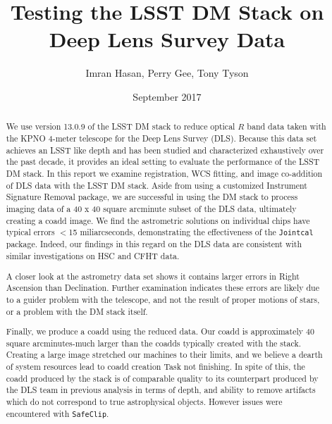 \documentclass[modern]{aastex61}
\begin{document}
\title{Testing the LSST DM Stack on Deep Lens Survey Data}

\author{Imran Hasan, Perry Gee, Tony Tyson}
\date{September 2017}




\begin{abstract}
We use version 13.0.9 of the LSST DM stack to reduce optical $R$ band data taken with the KPNO 4-meter telescope for the Deep Lens Survey (DLS). Because this data set achieves an LSST like depth and has been studied and characterized exhaustively over the past decade, it provides an ideal setting to evaluate the performance of the LSST DM stack. In this report we examine registration, WCS fitting, and image co-addition of DLS data with the LSST DM stack. Aside from using a customized Instrument Signature Removal package, we are successful in using the DM stack to process imaging data of a 40 x 40 square arcminute subset of the DLS data, ultimately creating a coadd image. We find the astrometric solutions on individual chips have typical errors $<$15 miliarcseconds, demonstrating the effectiveness of the {\tt\string Jointcal} package. Indeed, our findings in this regard on the DLS data are consistent with similar investigations on HSC and CFHT data.  

A closer look at the astrometry data set shows it contains larger errors in Right Ascension than Declination. Further examination indicates these errors are likely due to a guider problem with the telescope, and not the result of proper motions of stars, or a problem with the DM stack itself.

Finally, we produce a coadd using the reduced data. Our coadd is approximately 40 square arcminutes-much larger than the coadds typically created with the stack. Creating a large image stretched our machines to their limits, and we believe a dearth of system resources lead to coadd creation Task not finishing. In spite of this, the coadd produced by the stack is of comparable quality to its counterpart produced by the DLS team in previous analysis in terms of depth, and ability to remove artifacts which do not correspond to true astrophysical objects. However issues were encountered with {\tt\string SafeClip}.    
\end{abstract}
\end{document}
